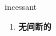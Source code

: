 
\begin{frame}
{\huge incessant}
\begin{center}
\begin{enumerate}\Large
  \item \textbf{无间断的}
\end{enumerate}
\end{center}
\end{frame}
